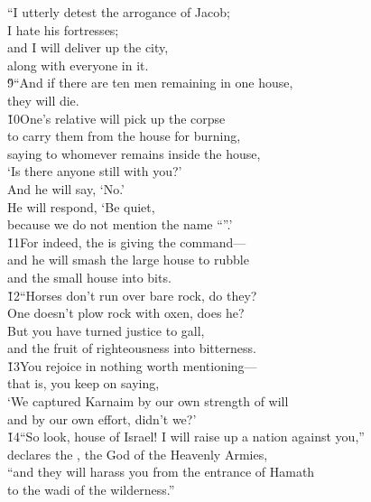 \begin{poetry}
\poeml ``I utterly detest the arrogance of Jacob; \\
\poemll    I hate his fortresses; \\
\poeml and I will deliver up the city, \\
\poemll    along with everyone in it. \\
\poeml \v{9}``And if there are ten men remaining in one house, \\
\poemll    they will die. \\
\poeml \v{10}One's relative will pick up the corpse \\
\poemll    to carry them from the house for burning, \\
\poeml saying to whomever remains inside the house, \\
\poemll    `Is there anyone still with you?' \\
\poeml And he will say, `No.' \\
\poemll    He will respond, `Be quiet, \\
\poemlll       because we do not mention the name ``''.' \\
\poeml \v{11}For indeed, the  is giving the command--- \\
\poemll    and he will smash the large house to rubble \\
\poemlll       and the small house into bits. \\
\poeml \v{12}``Horses don't run over bare rock, do they? \\
\poemll    One doesn't plow rock with oxen, does he? \\
\poeml But you have turned justice to gall, \\
\poemll    and the fruit of righteousness into bitterness. \\
\poeml \v{13}You rejoice in nothing worth mentioning--- \\
\poemll    that is, you keep on saying, \\
\poeml `We captured Karnaim by our own strength of will \\
\poemll    and by our own effort, didn't we?' \\
\poeml \v{14}``So look, house of Israel! I will raise up a nation against you,'' \\
\poemll    declares the , the God of the Heavenly Armies, \\
\poeml ``and they will harass you from the entrance of Hamath \\
\poemll    to the wadi of the wilderness.''
\end{poetry}

